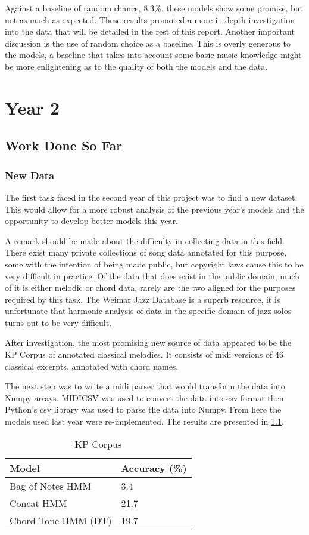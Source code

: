 \documentclass[bsc,singlespacing,logo, parskip, deptreport]{infthesis}
\begin{document}
Against a baseline of random chance, 8.3\%, these models show some promise, but not as much as expected. These results promoted a more in-depth investigation into the data that will be detailed in the rest of this report. Another important discussion is the use of random choice as a baseline. This is overly generous to the models, a baseline that takes into account some basic music knowledge might be more enlightening as to the quality of both the models and the data.

\chapter{Year 2}

\section{Work Done So Far}
\subsection{New Data}
The first task faced in the second year of this project was to find a new dataset. This would allow for a more robust analysis of the previous year's models and the opportunity to develop better models this year.

A remark should be made about the difficulty in collecting data in this field. There exist many private collections of song data annotated for this purpose, some with the intention of being made public, but copyright laws cause this to be very difficult in practice. Of the data that does exist in the public domain, much of it is either melodic or chord data, rarely are the two aligned for the purposes required by this task. The Weimar Jazz Database is a superb resource, it is unfortunate that harmonic analysis of data in the specific domain of jazz solos turns out to be very difficult.

After investigation, the most promising new source of data appeared to be the KP Corpus of annotated classical melodies. It consists of midi versions of 46 classical excerpts, annotated with chord names.

The next step was to write a midi parser that would transform the data into Numpy arrays. MIDICSV was used to convert the data into csv format then Python's csv library was used to parse the data into Numpy. From here the models used last year were re-implemented. The results are presented in \ref{kp}.

\begin{table}
\centering
\caption{KP Corpus}
\label{kp}
\begin{tabular}{l|l}
Model               & Accuracy (\%) \\ \hline
Bag of Notes HMM    & 3.4           \\
Concat HMM          & 21.7          \\
Chord Tone HMM (DT) & 19.7          \\
\end{tabular}
\end{table} 
\end{document}
